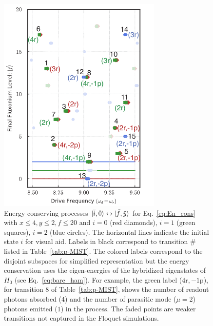 \documentclass[%
reprint,
superscriptaddress,
 amsmath,amssymb,
 aps,
 prx,
longbibliography,
floatfix,
]{revtex4-2}
\begin{document}
\begin{figure}[!htb]
    \centering
    \includegraphics[width=\linewidth]{Figures/Trans_.pdf}
    \caption{Energy conserving processes $\ket{\tilde{i},\tilde{0}}\leftrightarrow\ket{\tilde{f},\tilde{y}}$ for Eq.~\ref{eq:En_cons} with $x\le 4, y\le 2, f\le 20$ and $i=0$ (red diamonds), $i=1$ (green squares), $i=2$ (blue circles). The horizontal lines indicate the initial state $i$ for visual aid. Labels in black correspond to transition $\#$ listed in Table~\ref{tab:p-MIST}. The colored labels correspond to the disjoint subspaces for simplified representation but the energy conservation uses the eigen-energies of the hybridized eigenstates of $H_{0}$ (see Eq.~\ref{eq:bare_ham}). For example, the green label ($4 \mathrm{r},-1 \mathrm{p}$), for transition $8$ of Table~\ref{tab:p-MIST}, shows the number of readout photons absorbed ($4$) and the number of parasitic mode ($\mu=2$) photons emitted ($1$) in the process. The faded points are weaker transitions not captured in the Floquet simulations. 
}
    \label{fig:trans_prof}
\end{figure}
\end{document}
